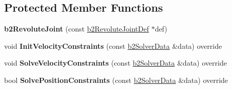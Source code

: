 \subsection*{Protected Member Functions}
\begin{DoxyCompactItemize}
\item 
\mbox{\label{classb2RevoluteJoint_a2571c1438e909fb3518de6f88bb29e01}} 
{\bfseries b2\+Revolute\+Joint} (const \mbox{\hyperlink{structb2RevoluteJointDef}{b2\+Revolute\+Joint\+Def}} $\ast$def)
\item 
\mbox{\label{classb2RevoluteJoint_a5ddddb865cc297c66721ae443bfb40a4}} 
void {\bfseries Init\+Velocity\+Constraints} (const \mbox{\hyperlink{structb2SolverData}{b2\+Solver\+Data}} \&data) override
\item 
\mbox{\label{classb2RevoluteJoint_a8eee8e87c79588ff041f1382b7fcbcd4}} 
void {\bfseries Solve\+Velocity\+Constraints} (const \mbox{\hyperlink{structb2SolverData}{b2\+Solver\+Data}} \&data) override
\item 
\mbox{\label{classb2RevoluteJoint_a01cab9d9609926a6debcd457bb8068f2}} 
bool {\bfseries Solve\+Position\+Constraints} (const \mbox{\hyperlink{structb2SolverData}{b2\+Solver\+Data}} \&data) override
\end{DoxyCompactItemize}
